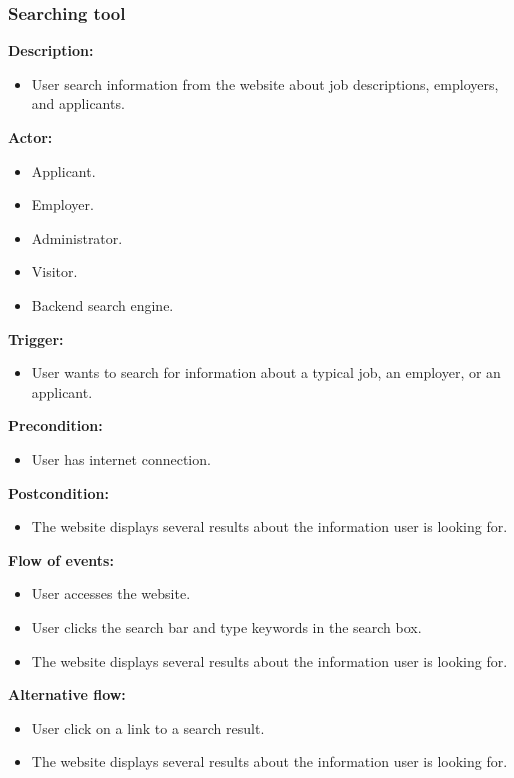 \documentclass[a4paper]{article}
\begin{document}
\subsubsection{Searching tool}
\textbf{Description:}
\begin{itemize}
    \item User search information from the website about job descriptions, employers, and applicants.
\end{itemize}

\textbf{Actor:}
\begin{itemize}
    \item Applicant.
    \item Employer.
    \item Administrator.
    \item Visitor.
    \item Backend search engine.
\end{itemize}

\textbf{Trigger:}
\begin{itemize}
    \item User wants to search for information about a typical job, an employer, or an applicant.
\end{itemize}

\textbf{Precondition:}
\begin{itemize}
    \item User has internet connection.
\end{itemize}

\textbf{Postcondition:}
\begin{itemize}
    \item The website displays several results about the information user is looking for.
\end{itemize}

\textbf{Flow of events:}
\begin{itemize}
    \item User accesses the website.
    \item User clicks the search bar and type keywords in the search box.
    \item The website displays several results about the information user is looking for.
\end{itemize}

\textbf{Alternative flow:}
\begin{itemize}
    \item User click on a link to a search result.
    \item The website displays several results about the information user is looking for.
\end{itemize}
\end{document}
